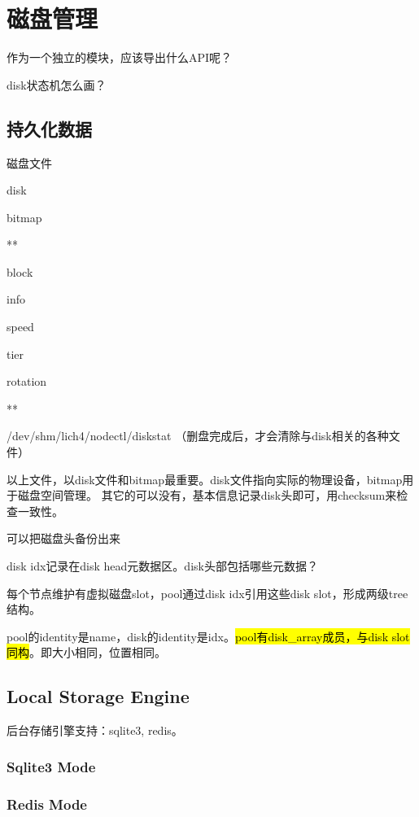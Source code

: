 \chapter{磁盘管理}

作为一个独立的模块，应该导出什么API呢？

disk状态机怎么画？

\section{持久化数据}

磁盘文件
\begin{enumbox}
\item disk
\item bitmap
\item ***
\item block
\item info
\item speed
\item tier
\item rotation
\item ***
\item /dev/shm/lich4/nodectl/diskstat （删盘完成后，才会清除与disk相关的各种文件）
\end{enumbox}

以上文件，以disk文件和bitmap最重要。disk文件指向实际的物理设备，bitmap用于磁盘空间管理。
其它的可以没有，基本信息记录disk头即可，用checksum来检查一致性。

可以把磁盘头备份出来

disk idx记录在disk head元数据区。disk头部包括哪些元数据？

每个节点维护有虚拟磁盘slot，pool通过disk idx引用这些disk slot，形成两级tree结构。

pool的identity是name，disk的identity是idx。\hl{pool有disk\_array成员，与disk slot同构}。即大小相同，位置相同。

\section{Local Storage Engine}

后台存储引擎支持：sqlite3, redis。

\subsection{Sqlite3 Mode}

\subsection{Redis Mode}

